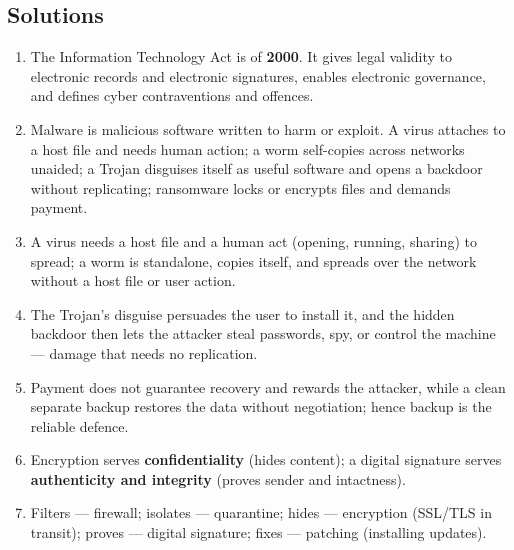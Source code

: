 \documentclass[11pt]{article}
\begin{document}
\subsection*{Solutions}
\begingroup\small
\begin{enumerate}[label=\arabic*.]
  \item The Information Technology Act is of \textbf{2000}. It gives legal
    validity to electronic records and electronic signatures, enables
    electronic governance, and defines cyber contraventions and offences.
  \item Malware is malicious software written to harm or exploit. A virus
    attaches to a host file and needs human action; a worm self-copies
    across networks unaided; a Trojan disguises itself as useful software
    and opens a backdoor without replicating; ransomware locks or encrypts
    files and demands payment.
  \item A virus needs a host file and a human act (opening, running,
    sharing) to spread; a worm is standalone, copies itself, and spreads
    over the network without a host file or user action.
  \item The Trojan's disguise persuades the user to install it, and the
    hidden backdoor then lets the attacker steal passwords, spy, or
    control the machine --- damage that needs no replication.
  \item Payment does not guarantee recovery and rewards the attacker,
    while a clean separate backup restores the data without negotiation;
    hence backup is the reliable defence.
  \item Encryption serves \textbf{confidentiality} (hides content);
    a digital signature serves \textbf{authenticity and integrity}
    (proves sender and intactness).
  \item Filters --- firewall; isolates --- quarantine; hides ---
    encryption (SSL/TLS in transit); proves --- digital signature;
    fixes --- patching (installing updates).
\end{enumerate}
\endgroup
\end{document}
